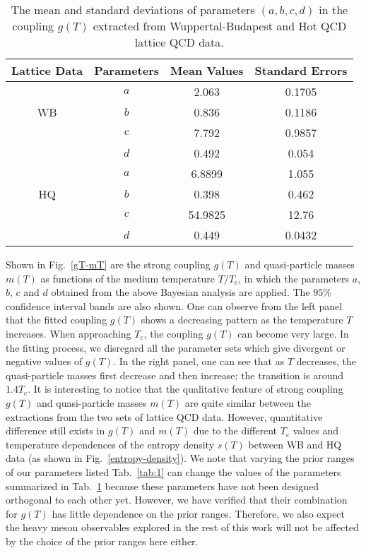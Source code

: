 \documentclass[aps,superscriptaddress,prc,twocolumn,nofootinbib]{revtex4}
\begin{document}
\begin{table}[htb]
\label{tab:2}
\centering
\vspace{-5pt}
\begin{tabular}{c|c|c|c}
 \hline
 Lattice Data & Parameters & Mean Values & Standard Errors  \\
 \hline
    & $a$ & 2.063 & 0.1705    \\
  WB   & $b$ & 0.836 & 0.1186   \\
      & $c$ & 7.792 & 0.9857   \\
      & $d$ & 0.492 & 0.054   \\ \hline
   & $a$ & 6.8899 & 1.055   \\
  HQ   & $b$ & 0.398 & 0.462  \\
  	  & $c$ & 54.9825 & 12.76  \\
  	  & $d$ & 0.449 & 0.0432   \\
  \hline
\end{tabular}
	\caption{The mean and standard deviations of parameters $(a,b,c,d)$ in the coupling $g(T)$ extracted from Wuppertal-Budapest and Hot QCD lattice QCD data.}
\end{table}

Shown in Fig.~\ref{gT-mT} are the strong coupling $g(T)$ and quasi-particle masses $m(T)$ as functions of the medium temperature $T/T_\mathrm{c}$, in which the parameters $a$, $b$, $c$ and $d$ obtained from the above Bayesian analysis are applied.
The $95\%$ confidence interval bands are also shown.
One can observe from the left panel that the fitted coupling $g(T)$ shows a decreasing pattern as the temperature $T$ increases. When approaching $T_\mathrm{c}$, the coupling $g(T)$ can become very large.
In the fitting process, we disregard all the parameter sets which give divergent or negative values of $g(T)$.
In the right panel, one can see that as $T$ decreases, the quasi-particle masses first decrease and then increase; the transition is around $1.4T_\mathrm{c}$.
It is interesting to notice that the qualitative feature of strong coupling $g(T)$ and quasi-particle masses $m(T)$ are quite similar between the extractions from the two sets of lattice QCD data. However, quantitative difference still exists in $g(T)$ and $m(T)$ due to the different $T_\mathrm{c}$ values and temperature dependences of the entropy density $s(T)$ between WB and HQ data (as shown in Fig.~\ref{entropy-density}).
{\color{blue} We note that varying the prior ranges of our parameters listed Tab.~\ref{tab:1} can change the values of the parameters summarized in Tab.~\ref{tab:2} because these parameters have not been designed orthogonal to each other yet. However, we have verified that their combination for $g(T)$ has little dependence on the prior ranges. Therefore, we also expect the heavy meson observables explored in the rest of this work will not be affected by the choice of the prior ranges here either.}
\end{document}
